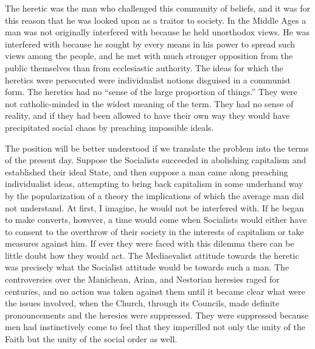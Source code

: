 \documentclass{book}
\begin{document}
The heretic was the man who challenged this community of beliefs, and it was for this reason that he was looked upon as a traitor to society. In the Middle Ages a man was not originally interfered with because he held unorthodox views. He was interfered with because he sought by every means in his power to spread such views among the people, and he met with much stronger opposition from the public themselves than from ecclesiastic authority. The ideas for which the heretics were persecuted were individualist notions disguised in a communist form. The heretics had no “sense of the large proportion of things.” They were not catholic-minded in the widest meaning of the term. They had no sense of reality, and if they had been allowed to have their own way they would have precipitated social chaos by preaching impossible ideals.

The position will be better understood if we translate the problem into the terms of the present day. Suppose the Socialists succeeded in abolishing capitalism and established their ideal State, and then suppose a man came along preaching individualist ideas, attempting to bring back capitalism in some underhand way by the popularization of a theory the implications of which the average man did not understand. At first, I imagine, he would not be interfered with. If he began to make converts, however, a time would come when Socialists would either have to consent to the overthrow of their society in the interests of capitalism or take measures against him. If ever they were faced with this dilemma there can be little doubt how they would act. The Mediaevalist attitude towards the heretic was precisely what the Socialist attitude would be towards such a man. The controversies over the Manichean, Arian, and Nestorian heresies raged for centuries, and no action was taken against them until it became clear what were the issues involved, when the Church, through its Councils, made definite pronouncements and the heresies were suppressed. They were suppressed because men had instinctively come to feel that they imperilled not only the unity of the Faith but the unity of the social order as well.
\end{document}
